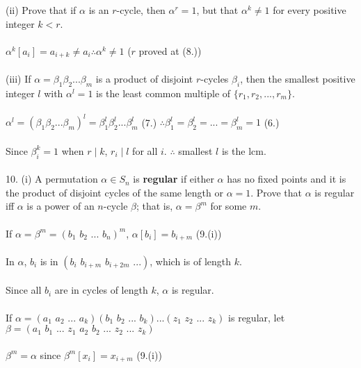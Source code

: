 \documentclass{article}
\begin{document}
\begin{siderules}
\color{blue}(ii) Prove that if \(\alpha\) is an \(r\)-cycle, then \(\alpha^r=1\), but that \(\alpha^k\neq 1\) for every positive integer \(k<r\).\color{black}\\\\
\null\qquad \(\alpha^k[a_i]=a_{i+k}\neq a_i \therefore \alpha^k\neq 1\) (\(r\) proved at \color{gray}(8.)\color{black})\\\\
\color{blue}(iii) If \(\alpha=\beta_1\beta_2...\beta_m\) is a product of disjoint \(r\)-cycles \(\beta_i\), then the smallest positive integer \(l\) with \(\alpha^l=1\) is the least common multiple of \(\{r_1,r_2,...,r_m\}\).\color{black}\\\\
\null\qquad\(\alpha^l=(\beta_1\beta_2...\beta_m)^l=\beta_1^l\beta_2^l...\beta_m^l\) \color{gray}(7.) \color{black}\(\therefore \beta_1^l=\beta_2^l=...=\beta_m^l=1\) \color{gray}(6.)\color{black}\\\\
\null\qquad Since \(\beta_i^k=1\) when \(r\mid k\), \(r_i\mid l\) for all \(i\). \(\therefore\) smallest \(l\) is the lcm.\\\\
\color{blue}10. (i) A permutation \(\alpha\in S_n\) is \textbf{regular} if either \(\alpha\) has no fixed points and it is the product of disjoint cycles of the same length or \(\alpha=1\). Prove that \(\alpha\) is regular iff \(\alpha\) is a power of an \(n\)-cycle \(\beta\); that is, \(\alpha=\beta^m\) for some \(m\).\color{black}\\\\
\null\qquad If \(\alpha=\beta^m=(b_1\,\,b_2\,\,...\,\,b_n)^m\), \(\alpha[b_i]=b_{i+m}\) \color{gray}(9.(i))\color{black}\\\\
\null\qquad In \(\alpha\), \(b_i\) is in \((b_i\,\,b_{i+m}\,\,b_{i+2m}\,\,...)\), which is of length \(k\).\\\\
\null\qquad Since all \(b_i\) are in cycles of length \(k\), \(\alpha\) is regular.\\\\
\null\qquad If \(\alpha=(a_1\,\,a_2\,\,...\,\,a_k)(b_1\,\,b_2\,\,...\,\,b_k)...(z_1\,\,z_2\,\,...\,\,z_k)\) is regular, let \(\beta=(a_1\,\,b_1\,\,...\,\,z_1\,\,a_2\,\,b_2\,\,...\,\,z_2\,\,...\,\,z_k)\)\\\\
\null\qquad\(\beta^m=\alpha\) since \(\beta^m[x_i]=x_{i+m}\) \color{gray}(9.(i))\color{black}\\\\

\end{siderules}
\end{document}
